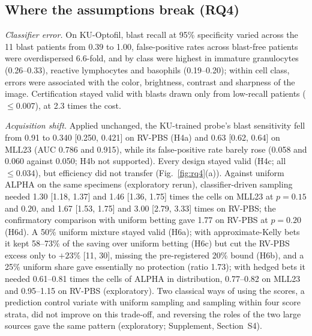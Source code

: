 \documentclass[journal]{IEEEtran}
\begin{document}
\subsection{Where the assumptions break (RQ4)}\label{sec:rq4}
\emph{Classifier error.} On KU-Optofil, blast recall at 95\% specificity varied across the 11 blast patients from 0.39 to 1.00, false-positive rates across blast-free patients were overdispersed 6.6-fold, and by class were highest in immature granulocytes (0.26--0.33), reactive lymphocytes and basophils (0.19--0.20); within cell class, errors were associated with the color, brightness, contrast and sharpness of the image. Certification stayed valid with blasts drawn only from low-recall patients ($\le0.007$), at 2.3 times the cost.

\emph{Acquisition shift.} Applied unchanged, the KU-trained probe's blast sensitivity fell from 0.91 to 0.340 [0.250, 0.421] on RV-PBS (H4a) and 0.63 [0.62, 0.64] on MLL23 (AUC 0.786 and 0.915), while its false-positive rate barely rose (0.058 and 0.060 against 0.050; H4b not supported). Every design stayed valid (H4c; all $\le0.034$), but efficiency did not transfer (Fig.~\ref{fig:rq4}(a)). Against uniform ALPHA on the same specimens (exploratory rerun), classifier-driven sampling needed 1.30 [1.18, 1.37] and 1.46 [1.36, 1.75] times the cells on MLL23 at $p=0.15$ and $0.20$, and 1.67 [1.53, 1.75] and 3.00 [2.79, 3.33] times on RV-PBS; the confirmatory comparison with uniform betting gave 1.77 on RV-PBS at $p=0.20$ (H6d). A 50\% uniform mixture stayed valid (H6a); with approximate-Kelly bets it kept 58--73\% of the saving over uniform betting (H6c) but cut the RV-PBS excess only to $+23\%$ [11, 30], missing the pre-registered 20\% bound (H6b), and a 25\% uniform share gave essentially no protection (ratio 1.73); with hedged bets it needed 0.61--0.81 times the cells of ALPHA in distribution, 0.77--0.82 on MLL23 and 0.95--1.15 on RV-PBS (exploratory). Two classical ways of using the scores, a prediction control variate with uniform sampling and sampling within four score strata, did not improve on this trade-off, and reversing the roles of the two large sources gave the same pattern (exploratory; Supplement, Section~S4).
\end{document}
